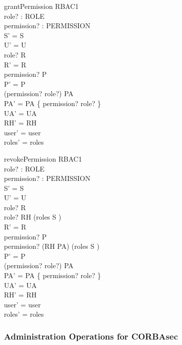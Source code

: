 \begin{zedgroup}
  \begin{schema}{grantPermission}
    \Delta RBAC1\\
    role? : ROLE\\
    permission? : PERMISSION\\
    \where
    S' = S\\
    U' = U\\
    role? \in R\\
    R' = R\\
    permission? \in P\\
    P' = P\\
    (permission? \mapsto role?) \notin PA\\
    PA' = PA \oplus \{ permission? \mapsto role? \}\\
    UA' = UA\\
    RH' = RH\\
    user' = user\\
    roles' = roles\\
  \end{schema}
  \begin{schema}{revokePermission}
    \Delta RBAC1\\
    role? : ROLE\\
    permission? : PERMISSION\\
    \where
    S' = S\\
    U' = U\\
    role? \in R\\
    role? \notin RH \limg \bigcup(roles \limg S \rimg) \rimg\\
    R' = R\\
    permission? \in P\\
    permission? \notin (RH \comp PA\inv) \limg \bigcup(roles \limg S \rimg) \rimg\\
    P' = P\\
    (permission? \mapsto role?) \in PA\\
    PA' = PA \setminus \{ permission? \mapsto role? \}\\
    UA' = UA\\
    RH' = RH\\
    user' = user\\
    roles' = roles\\
  \end{schema}
\end{zedgroup}


\subsubsection{Administration Operations for CORBAsec}


